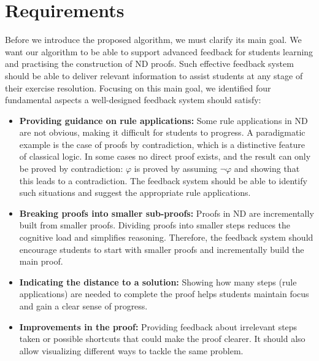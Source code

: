 \section{Requirements}
Before we introduce the proposed algorithm, we must clarify its main goal. We want our algorithm to be able to support advanced feedback for students learning and practising the construction of ND proofs. Such effective feedback system should be able to deliver relevant information to assist students at any stage of their exercise resolution. Focusing on this main goal, we identified four fundamental aspects a well-designed feedback system should satisfy:

\begin{itemize}

\item \textbf {Providing guidance on rule applications:} Some rule applications in ND are not obvious, making it difficult for students to progress. A paradigmatic example is the case of proofs by contradiction, which is a distinctive feature of classical logic. In some cases no direct proof exists, and the result can only be proved by contradiction: \(\varphi\) is proved by assuming \(\neg \varphi\) and showing that this leads to a contradiction. The feedback system should be able to identify such situations and suggest the appropriate rule applications.

\item \textbf {Breaking proofs into smaller sub-proofs:} Proofs in ND are incrementally built from smaller proofs. Dividing proofs into smaller steps reduces the cognitive load and simplifies reasoning. Therefore, the feedback system should encourage students to start with smaller proofs and incrementally build the main proof. 

\item \textbf{Indicating the distance to a solution:} Showing how many steps (rule applications) are needed to complete the proof helps students maintain focus and gain a clear sense of progress.

\item \textbf{Improvements in the proof:} Providing feedback about irrelevant steps taken or possible shortcuts that could make the proof clearer. It should also allow visualizing different ways to tackle the same problem.

\end{itemize}
